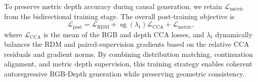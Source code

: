 To preserve metric depth accuracy during causal generation, we retain $\mathcal{L}_{\mathrm{metric}}$ from the bidirectional training stage.
%
The overall post-training objective is
\begin{equation}
\mathcal{L}_{\mathrm{post}}
=\mathcal{L}_{\mathrm{RDM}}
+\operatorname{sg}(\lambda_t)
\mathcal{L}_{\mathrm{CCA}}+\mathcal{L}_{\mathrm{metric}},
\label{eq:causal_objective}
\end{equation}
where $\mathcal{L}_{\mathrm{CCA}}$ is the mean of the RGB and depth CCA losses, and $\lambda_t$ dynamically balances the RDM and paired-supervision gradients based on the relative CCA residuals and gradient norms.
%
By combining distribution matching, continuation alignment, and metric depth supervision, this training strategy enables coherent autoregressive RGB-Depth generation while preserving geometric consistency.



